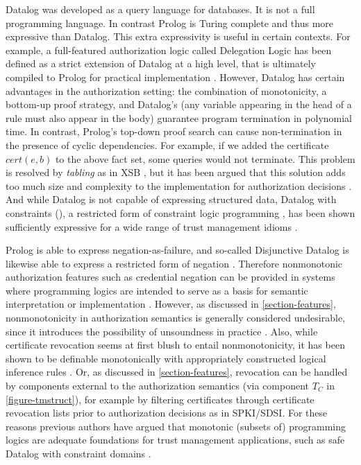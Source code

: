 Datalog was developed as a query language for databases. It is not a full
programming language. In contrast Prolog is Turing complete and thus more
expressive than Datalog. This extra expressivity is useful in certain
contexts. For example, a full-featured authorization logic called
Delegation Logic has been defined as a strict extension of Datalog at a
high level, that is ultimately compiled to Prolog for practical
implementation \cite{Li:DLLBADA}. However, Datalog has certain advantages
in the authorization setting: the combination of monotonicity, a bottom-up
proof strategy, and Datalog's  (any variable
appearing in the head of a rule must also appear in the body) guarantee
program termination in polynomial time. In contrast, Prolog's top-down
proof search can cause non-termination in the presence of cyclic
dependencies. For example, if we added the certificate $\mathit{cert}(e,b)$
to the above fact set, some queries would not terminate. This problem is
resolved by \emph{tabling} as in XSB \cite{xsb-page}, but it has been
argued that this solution adds too much size and complexity to the
implementation for authorization decisions \cite{Li:DRBTMF}. And while
Datalog is not capable of expressing structured data, Datalog with
constraints (\datalogc), a restricted form of constraint logic programming
\cite{jaffar-maher-jlp94}, has been shown sufficiently expressive for a
wide range of trust management idioms \cite{Li:DCFTML}.

Prolog is able to express negation-as-failure, and so-called
Disjunctive Datalog is likewise able to express a restricted form of
negation \cite{eiter-etal-tdbs97}.  
Therefore nonmonotonic
authorization features such as credential negation can be provided in
systems where programming logics are intended to serve as a basis for
semantic interpretation or implementation
\cite{woo93authorizations,bonatti-logicsforauth}.  However, as
discussed in \autoref{section-features}, nonmonotonicity in
authorization semantics is generally considered undesirable, since it
introduces the possibility of unsoundness in practice
\cite{seamons-policy02}.  Also, while certificate revocation seems at
first blush to entail nonmonotonicity, it has been shown to be
definable monotonically with appropriately constructed logical
inference rules \cite{lbi-fc01,Bauer:GFACSW}.  Or, as discussed in
\autoref{section-features}, revocation can be handled by components
external to the authorization semantics (via component $T_C$ in
\autoref{figure-tmstruct}), for example by filtering certificates
through certificate revocation lists prior to authorization decisions
as in SPKI/SDSI.  For these reasons previous authors have argued that
monotonic (subsets of) programming logics are adequate foundations for
trust management applications, such as safe Datalog with constraint
domains \cite{Li:DCFTML}.

